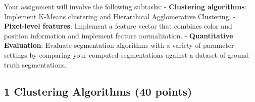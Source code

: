 \documentclass[11pt]{article}
\begin{document}
Your assignment will involve the following subtasks: -
\textbf{Clustering algorithms}: Implement K-Means clustering and
Hierarchical Agglomerative Clustering. - \textbf{Pixel-level features}:
Implement a feature vector that combines color and position information
and implement feature normalization. - \textbf{Quantitative Evaluation}:
Evaluate segmentation algorithms with a variety of parameter settings by
comparing your computed segmentations against a dataset of ground-truth
segmentations.

    \hypertarget{clustering-algorithms-40-points}{%
\subsection{1 Clustering Algorithms (40
points)}\label{clustering-algorithms-40-points}}
\end{document}

